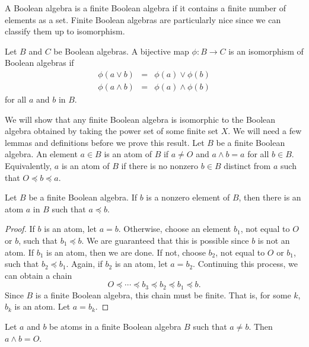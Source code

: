  
A Boolean algebra is a {\bfi finite Boolean algebra\/} if it contains a finite number of elements as a set.
Finite Boolean algebras are particularly nice since we can classify
them  up to isomorphism.   
 
 
Let $B$ and $C$ be Boolean algebras.  A bijective map $\phi : B
\rightarrow C$ is an {\bfi isomorphism\/} of Boolean
algebras  if 
\begin{eqnarray*}
\phi( a \vee b )  & = & \phi(a) \vee \phi(b) \\
\phi( a \wedge b )  & = & \phi(a) \wedge \phi(b)
\end{eqnarray*}
for all $a$ and $b$ in $B$. 
 
 
We will show that any finite Boolean algebra is isomorphic to the 
Boolean algebra obtained by taking the power set of some finite set 
$X$. We will need a few lemmas and definitions before we prove this result.
Let $B$ be a finite Boolean algebra. An element $a \in B$ is  an {\bfi
atom\/} of $B$ if $a \neq
O$ and $a \wedge b = a$ for all  $b \in B$. Equivalently, $a$ is an
atom of $B$ if there is no nonzero $b \in B$ distinct from $a$ such
that $O \preceq b \preceq a$. 
 
 
\begin{lemma}
Let $B$ be a finite Boolean algebra. If $b$ is a nonzero element of
$B$, then there is an atom $a$ in $B$ such that $a \preceq b$.
\end{lemma}
 
 
\begin{proof}
If $b$ is an atom, let $a =b$. Otherwise, choose an element $b_1$, not
equal to $O$ or $b$, such that $b_1 \preceq b$. We are guaranteed that
this is possible since $b$ is not an atom. If $b_1$ is an atom, then
we are done.  If not, choose $b_2$, not equal to $O$ or $b_1$, such that 
$b_2 \preceq b_1$. Again, if $b_2$ is an atom, let $a = b_2$.
Continuing this process, we can obtain a chain
$$
O \preceq \cdots \preceq b_3 \preceq b_2 \preceq b_1 \preceq b.
$$
Since $B$ is a finite Boolean algebra, this chain must be finite.  That
is, for some $k$, $b_k$ is an atom. Let $a = b_k$.
\end{proof}
 
 
\begin{lemma}
Let $a$ and $b$ be atoms in a finite Boolean algebra $B$ such that $a
\neq b$. Then $a \wedge b = O$.
\end{lemma}
 
